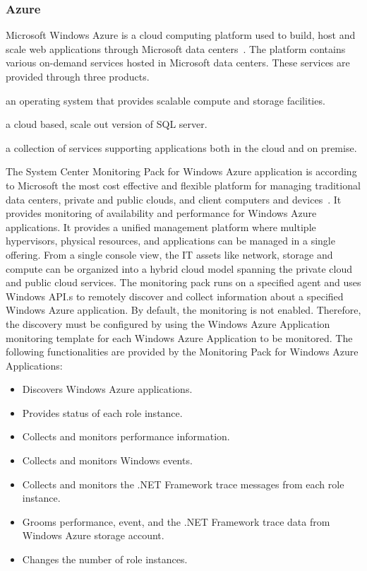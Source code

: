 \documentclass{sig-alternate-05-2015}
\begin{document}
\subsubsection{Azure}

Microsoft Windows Azure is a cloud computing platform used to build, host and scale web applications through Microsoft data centers~\cite{azure11}. The platform contains various on-demand services hosted in Microsoft data centers. These services are provided through three products.

\begin{description}
\setlength\itemsep{-2pt} 

\item[\it Windows Azure:] an operating system that provides scalable compute and storage facilities.

 \item[\it SQL Azure:] a cloud based, scale out version of SQL server.

 \item[\it Windows Azure AppFabric:] a collection of services supporting applications both in the cloud and on premise.

\end{description}

The System Center Monitoring Pack for Windows Azure application is according to Microsoft the most cost effective and flexible platform for managing traditional data centers, private and public clouds, and client computers and devices~\cite{MonitoringPackAzure11}. It provides monitoring of availability and performance for Windows Azure applications. It provides a unified management platform where multiple hypervisors, physical resources, and applications can be managed in a single offering. From a single console view, the IT assets like network, storage and compute can be organized into a hybrid cloud model spanning the private cloud and public cloud services. The monitoring pack runs on a specified agent and uses Windows API.s to remotely discover and collect information about a specified Windows Azure application. By default, the monitoring is not enabled. Therefore, the discovery must be configured by using the Windows Azure Application monitoring template for each Windows Azure Application to be monitored. The following functionalities are provided by the Monitoring Pack for Windows Azure Applications:

\begin{itemize}
\setlength\itemsep{-2pt} 

 \item Discovers Windows Azure applications.
 \item Provides status of each role instance.
 \item Collects and monitors performance information.
 \item Collects and monitors Windows events.
 \item Collects and monitors the .NET Framework trace messages from each role instance.
 \item Grooms performance, event, and the .NET Framework trace data from Windows Azure storage account.
 \item Changes the number of role instances.
\end{itemize}
\end{document}
